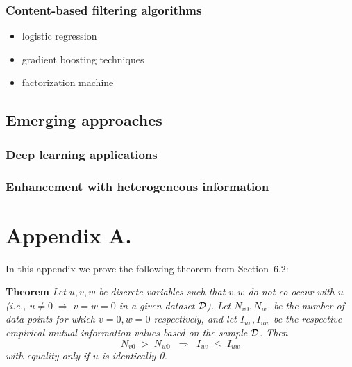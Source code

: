 \documentclass[twoside,11pt]{article}
\newcommand{\dataset}{{\cal D}}
\begin{document}
\subsubsection{Content-based filtering algorithms}
\begin{itemize}
  \item logistic regression
  \item gradient boosting techniques
  \item factorization machine
\end{itemize}
\subsection{Emerging approaches}
\subsubsection{Deep learning applications}
\subsubsection{Enhancement with heterogeneous information}




\newpage

\appendix
\section*{Appendix A.}
\label{app:theorem}



In this appendix we prove the following theorem from
Section~6.2:

\noindent
{\bf Theorem} {\it Let $u,v,w$ be discrete variables such that $v, w$ do
not co-occur with $u$ (i.e., $u\neq0\;\Rightarrow \;v=w=0$ in a given
dataset $\dataset$). Let $N_{v0},N_{w0}$ be the number of data points for
which $v=0, w=0$ respectively, and let $I_{uv},I_{uw}$ be the
respective empirical mutual information values based on the sample
$\dataset$. Then
\[
	N_{v0} \;>\; N_{w0}\;\;\Rightarrow\;\;I_{uv} \;\leq\;I_{uw}
\]
with equality only if $u$ is identically 0.} \hfill\BlackBox
\end{document}
